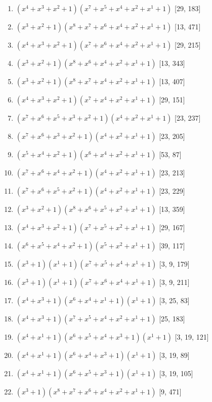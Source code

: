 \documentclass[10pt,twocolumn]{article}
\begin{document}
\begin{enumerate}
\item $(x^{4} + x^{3} + x^{2} + 1)(x^{7} + x^{5} + x^{4} + x^{2} + x^{1} + 1)$  [29, 183]
\item $(x^{3} + x^{2} + 1)(x^{8} + x^{7} + x^{6} + x^{4} + x^{2} + x^{1} + 1)$  [13, 471]
\item $(x^{4} + x^{3} + x^{2} + 1)(x^{7} + x^{6} + x^{4} + x^{2} + x^{1} + 1)$  [29, 215]
\item $(x^{3} + x^{2} + 1)(x^{8} + x^{6} + x^{4} + x^{2} + x^{1} + 1)$  [13, 343]
\item $(x^{3} + x^{2} + 1)(x^{8} + x^{7} + x^{4} + x^{2} + x^{1} + 1)$  [13, 407]
\item $(x^{4} + x^{3} + x^{2} + 1)(x^{7} + x^{4} + x^{2} + x^{1} + 1)$  [29, 151]
\item $(x^{7} + x^{6} + x^{5} + x^{3} + x^{2} + 1)(x^{4} + x^{2} + x^{1} + 1)$  [23, 237]
\item $(x^{7} + x^{6} + x^{3} + x^{2} + 1)(x^{4} + x^{2} + x^{1} + 1)$  [23, 205]
\item $(x^{5} + x^{4} + x^{2} + 1)(x^{6} + x^{4} + x^{2} + x^{1} + 1)$  [53, 87]
\item $(x^{7} + x^{6} + x^{4} + x^{2} + 1)(x^{4} + x^{2} + x^{1} + 1)$  [23, 213]
\item $(x^{7} + x^{6} + x^{5} + x^{2} + 1)(x^{4} + x^{2} + x^{1} + 1)$  [23, 229]
\item $(x^{3} + x^{2} + 1)(x^{8} + x^{6} + x^{5} + x^{2} + x^{1} + 1)$  [13, 359]
\item $(x^{4} + x^{3} + x^{2} + 1)(x^{7} + x^{5} + x^{2} + x^{1} + 1)$  [29, 167]
\item $(x^{6} + x^{5} + x^{4} + x^{2} + 1)(x^{5} + x^{2} + x^{1} + 1)$  [39, 117]
\item $(x^{3} + 1)(x^{1} + 1)(x^{7} + x^{5} + x^{4} + x^{1} + 1)$  [3, 9, 179]
\item $(x^{3} + 1)(x^{1} + 1)(x^{7} + x^{6} + x^{4} + x^{1} + 1)$  [3, 9, 211]
\item $(x^{4} + x^{3} + 1)(x^{6} + x^{4} + x^{1} + 1)(x^{1} + 1)$  [3, 25, 83]
\item $(x^{4} + x^{3} + 1)(x^{7} + x^{5} + x^{4} + x^{2} + x^{1} + 1)$  [25, 183]
\item $(x^{4} + x^{1} + 1)(x^{6} + x^{5} + x^{4} + x^{3} + 1)(x^{1} + 1)$  [3, 19, 121]
\item $(x^{4} + x^{1} + 1)(x^{6} + x^{4} + x^{3} + 1)(x^{1} + 1)$  [3, 19, 89]
\item $(x^{4} + x^{1} + 1)(x^{6} + x^{5} + x^{3} + 1)(x^{1} + 1)$  [3, 19, 105]
\item $(x^{3} + 1)(x^{8} + x^{7} + x^{6} + x^{4} + x^{2} + x^{1} + 1)$  [9, 471]

\end{enumerate}
\end{document}
